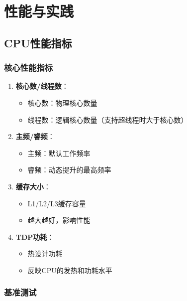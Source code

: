 \documentclass[12pt,UTF8]{ctexbook}
\begin{document}
\part{性能与实践}

\chapter{CPU性能指标}

\section{核心性能指标}

\begin{enumerate}
    \item \textbf{核心数/线程数}：
    \begin{itemize}[leftmargin=2em]
        \item 核心数：物理核心数量
        \item 线程数：逻辑核心数量（支持超线程时大于核心数）
    \end{itemize}
    
    \item \textbf{主频/睿频}：
    \begin{itemize}[leftmargin=2em]
        \item 主频：默认工作频率
        \item 睿频：动态提升的最高频率
    \end{itemize}
    
    \item \textbf{缓存大小}：
    \begin{itemize}[leftmargin=2em]
        \item L1/L2/L3缓存容量
        \item 越大越好，影响性能
    \end{itemize}
    
    \item \textbf{TDP功耗}：
    \begin{itemize}[leftmargin=2em]
        \item 热设计功耗
        \item 反映CPU的发热和功耗水平
    \end{itemize}
\end{enumerate}

\section{基准测试}
\end{document}
